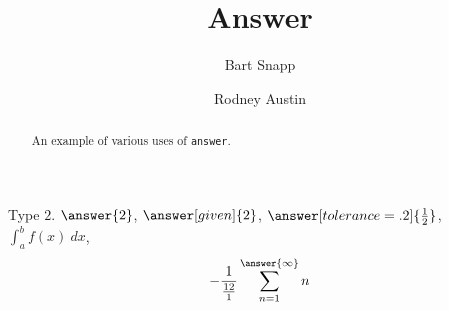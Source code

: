 \documentclass{ximera}
\title[Examples:]{Answer}
\author{Bart Snapp \and Rodney Austin}
\begin{document}
\begin{abstract}
  An example of various uses of \texttt{answer}.
\end{abstract}
\maketitle

\begin{problem}
  Type $2$. $\answer{2}$, $\answer[given]{2}$, $\answer[tolerance=.2]{\frac{1}{2}}$,  $\int_a^b f(x) \ dx$,
  \[
  -\frac{1}{\frac{12}{1}}\sum_{n=1}^{\answer{\infty}} n
  \]
\end{problem}
\end{document}
